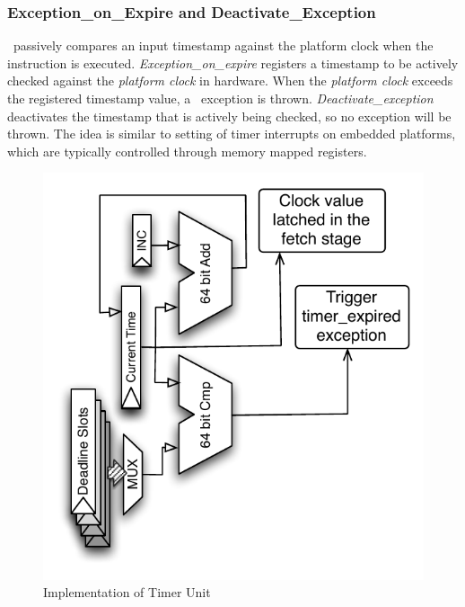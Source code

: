 \subsubsection{Exception\_on\_Expire and Deactivate\_Exception}
\Delayuntil\ passively compares an input timestamp against the platform clock when the instruction is executed.
\emph{Exception\_on\_expire} registers a timestamp to be actively checked against the \emph{platform clock} in hardware.
When the \emph{platform clock} exceeds the registered timestamp value, a \timerexpired\ exception is thrown.
\emph{Deactivate\_exception} deactivates the timestamp that is actively being checked, so no exception will be thrown.
The idea is similar to setting of timer interrupts on embedded platforms, which are typically controlled through memory mapped registers.

\begin{figure}
  \vspace{-20pt}
  \begin{center}
    \includegraphics[scale=.6]{figs/timer_unit_circuit}
  \end{center}
  \vspace{-5mm}
  \caption{Implementation of Timer Unit}
  \label{fig:timer_unit_circuit}
  \vspace{-13pt}
\end{figure} 

